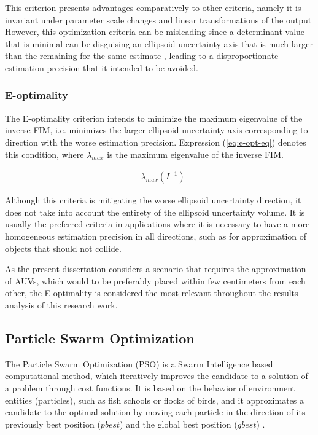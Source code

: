 This criterion presents advantages comparatively to other criteria, namely it is invariant under parameter scale changes and linear transformations of the output However, this optimization criteria can be misleading since a determinant value that is minimal can be disguising an ellipsoid uncertainty axis that is much larger than the remaining for the same estimate \cite{d-opt-mislead}, leading to a disproportionate estimation precision that it intended to be avoided.


\subsubsection{E-optimality}

The E-optimality criterion intends to minimize the maximum eigenvalue of the inverse FIM, i.e. minimizes the larger ellipsoid uncertainty axis corresponding to direction with the worse estimation precision. Expression (\ref{eq:e-opt-eq}) \cite{compare-optimality-crit} denotes this condition, where $\lambda_{max}$ is the maximum eigenvalue of the inverse FIM.

\begin{eqnarray}
	& \lambda_{max}(I^{-1})
	\label{eq:e-opt-eq}
\end{eqnarray}

Although this criteria is mitigating the worse ellipsoid uncertainty direction, it does not take into account the entirety of the ellipsoid uncertainty volume. It is usually the preferred criteria in applications where it is necessary to have a more homogeneous estimation precision in all directions, such as for approximation of objects that should not collide. 

As the present dissertation considers a scenario that requires the approximation of AUVs, which would to be preferably placed within few centimeters from each other, the E-optimality is considered the most relevant throughout the results analysis of this research work.

\subsection{Particle Swarm Optimization}

The Particle Swarm Optimization (PSO) is a Swarm Intelligence based computational method, which iteratively improves the candidate to a solution of a problem through cost functions. It is based on the behavior of environment entities (particles), such as fish schools or flocks of birds, and it approximates a candidate to the optimal solution by moving each particle in the direction of its previously best position ($pbest$) and the global best position ($gbest$) \cite{pso-surv}.

